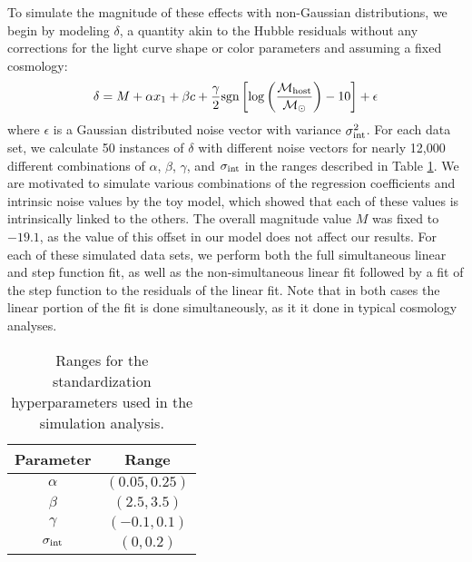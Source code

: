 To simulate the magnitude of these effects with non-Gaussian distributions, we begin by modeling $\delta$, a quantity akin to the Hubble residuals without any corrections for the light curve shape or color parameters and assuming a fixed cosmology:
\begin{equation}
    \delta= M + \alpha x_1 + \beta c + \frac{\gamma}{2}\text{sgn}\left[\log\left(\frac{\mathcal{M}_\text{host}}{\mathcal{M}_\odot}\right) - 10 \right] + \epsilon
\end{equation}
where $\epsilon$ is a Gaussian distributed noise vector with variance $\sigma_{\text{int}}^2$. For each data set, we calculate 50 instances of $\delta$ with different noise vectors for nearly 12,000 different combinations of $\alpha$, $\beta$, $\gamma$, and $\sigma_{\text{int}}$ in the ranges described in Table \ref{tab:sim_ranges}. We are motivated to simulate various combinations of the regression coefficients and intrinsic noise values by the toy model, which showed that each of these values is intrinsically linked to the others. The overall magnitude value $M$ was fixed to $-19.1$, as the value of this offset in our model does not affect our results. For each of these simulated data sets, we perform both the full simultaneous linear and step function fit, as well as the non-simultaneous linear fit followed by a fit of the step function to the residuals of the linear fit. Note that in both cases the linear portion of the fit is done simultaneously, as it it done in typical cosmology analyses.

\begin{table}
    \centering
    \begin{tabular}{cc}
    \toprule
        Parameter & Range \\\midrule
        $\alpha$ & $(0.05, 0.25)$ \\
        $\beta$ & $(2.5, 3.5)$ \\
        $\gamma$ & $(-0.1, 0.1)$ \\
        $\sigma_{\text{int}}$ & $(0, 0.2)$ \\
        \bottomrule
    \end{tabular}
    \caption{Ranges for the standardization hyperparameters used in the simulation analysis.}
    \label{tab:sim_ranges}
\end{table}

